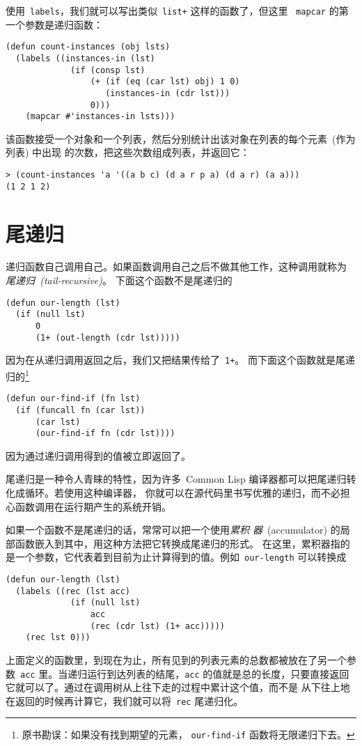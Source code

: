 使用~\texttt{labels}，我们就可以写出类似~\texttt{list+} 这样的函数了，但这里
~\texttt{mapcar} 的第一个参数是递归函数：\label{fun:count-instances}
\begin{lstlisting}
(defun count-instances (obj lsts)
  (labels ((instances-in (lst)
             (if (consp lst)
                 (+ (if (eq (car lst) obj) 1 0)
                    (instances-in (cdr lst)))
                 0)))
    (mapcar #'instances-in lsts)))
\end{lstlisting}
该函数接受一个对象和一个列表，然后分别统计出该对象在列表的每个元素~(作为列表) 中出现
的次数，把这些次数组成列表，并返回它：
\begin{lstlisting}
> (count-instances 'a '((a b c) (d a r p a) (d a r) (a a)))
(1 2 1 2)
\end{lstlisting}

\section{尾递归}
\label{sec:tail-recursion}

递归函数自己调用自己。如果函数调用自己之后不做其他工作，这种调用就称为
\emph{尾递归~(tail-recursive)}。
下面这个函数不是尾递归的\label{func:our-length_native}
\begin{lstlisting}
(defun our-length (lst)
  (if (null lst)
      0
      (1+ (out-length (cdr lst)))))
\end{lstlisting}
因为在从递归调用返回之后，我们又把结果传给了~\texttt{1+}。
而下面这个函数就是尾递归的\footnote{原书勘误：如果没有找到期望的元素，
  \texttt{our-find-if} 函数将无限递归下去。}
\begin{lstlisting}
(defun our-find-if (fn lst)
  (if (funcall fn (car lst))
      (car lst)
      (our-find-if fn (cdr lst))))
\end{lstlisting}
因为通过递归调用得到的值被立即返回了。

尾递归是一种令人青睐的特性，因为许多~Common Lisp
编译器都可以把尾递归转化成循环。若使用这种编译器，
你就可以在源代码里书写优雅的递归，而不必担心函数调用在运行期产生的系统开销。

如果一个函数不是尾递归的话，常常可以把一个使用\emph{累积
  器}~(accumulator) 的局部函数嵌入到其中，用这种方法把它转换成尾递归的形式。
在这里，累积器指的是一个参数，它代表着到目前为止计算得到的值。例如~\texttt{our-length}
可以转换成
\begin{lstlisting}
(defun our-length (lst)
  (labels ((rec (lst acc)
             (if (null lst)
                 acc
                 (rec (cdr lst) (1+ acc)))))
    (rec lst 0)))
\end{lstlisting}
上面定义的函数里，到现在为止，所有见到的列表元素的总数都被放在了另一个参数~\texttt{acc}
里。当递归运行到达列表的结尾，\texttt{acc}
的值就是总的长度，只要直接返回它就可以了。通过在调用树从上往下走的过程中累计这个值，而不是
从下往上地在返回的时候再计算它，我们就可以将~\texttt{rec} 尾递归化。

